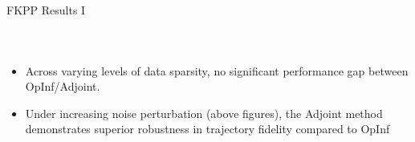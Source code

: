 \begin{frame}{FKPP Results I}
    
  \begin{columns}[T,onlytextwidth]  %
      \centering
      \label{fig:left2}


      \centering
      \label{fig:right2}
  \end{columns}

  \begin{itemize}
      \vspace{0.1cm} 
      \item Across varying levels of data sparsity, no significant performance gap between OpInf/Adjoint.
      \vspace{0.1cm}
      \item Under increasing noise perturbation (above figures), the Adjoint method demonstrates superior robustness in trajectory fidelity compared to OpInf
  \end{itemize}

\end{frame}

